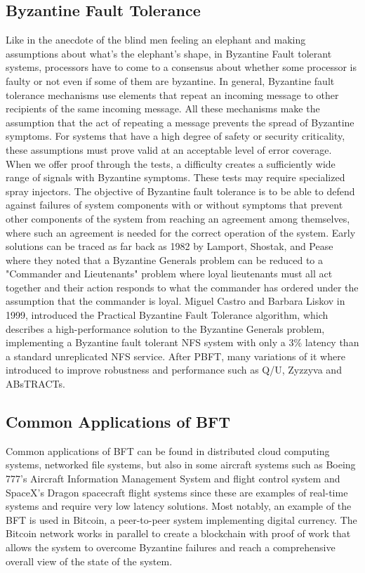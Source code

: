 \documentclass[12pt,a4paper]{report}
\begin{document}
			\subsection{Byzantine Fault Tolerance}
			Like in the anecdote of the	blind men feeling an elephant and making assumptions about what's the elephant's shape, in Byzantine Fault tolerant
			systems, processors have to come to a consensus about whether some processor is faulty or not even if some of them are byzantine. In general, 
			Byzantine fault tolerance mechanisms use elements that repeat an incoming message to other recipients of the same incoming message. All these
			mechanisms make the assumption that the act of repeating a message prevents the spread of Byzantine symptoms.
			For systems that have a high degree of safety or security criticality, these assumptions must prove valid at an acceptable level of error
			coverage. When we offer proof through the tests, a difficulty creates a sufficiently wide range of signals with Byzantine symptoms. These
			tests may require specialized spray injectors.
			The objective of Byzantine fault tolerance is to be able to defend against failures of system components with or without symptoms that prevent
			other components of the system from reaching an agreement among themselves, where such an agreement is needed for the correct operation of the
			system. Early solutions can be traced as far back as 1982 by Lamport, Shostak, and Pease\cite{generals} where they noted that a Byzantine Generals
			 problem can
			be reduced to a "Commander and Lieutenants" problem where loyal lieutenants must all act together and their action responds to what the commander
			has ordered under the assumption that the commander is loyal. Miguel Castro and Barbara Liskov in 1999\cite{pbft}, introduced the Practical
			Byzantine Fault Tolerance algorithm, which describes a high-performance solution to the Byzantine Generals problem, implementing a Byzantine fault
			tolerant NFS system with only a 3\% latency than a standard unreplicated NFS service. After PBFT, many variations of it where introduced to 
			improve robustness and performance such as  Q/U\cite{qu}, Zyzzyva\cite{zyzzyva} and ABsTRACTs\cite{abstracts}.

			\subsection{Common Applications of BFT}
			Common applications of BFT can be found in distributed cloud computing systems, networked file systems, but also in some aircraft systems such as
			Boeing 777's Aircraft Information Management System and flight control system and SpaceX's Dragon spacecraft flight systems since these are
			examples of real-time systems and require very low latency solutions. Most notably, an example of the BFT is used in Bitcoin, a peer-to-peer 
			system implementing digital currency. The Bitcoin network works in parallel to create a blockchain with proof of work that allows the system to 
			overcome Byzantine failures and reach a comprehensive overall view of the state of the system.
			
\end{document}
